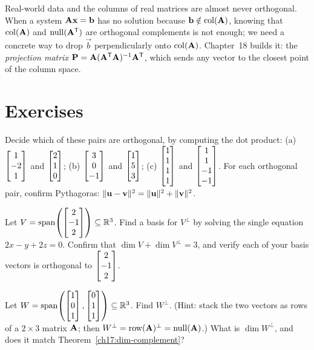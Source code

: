 \begin{connectionbox}
Real-world data and the columns of real matrices are almost never orthogonal. When a system
$\mathbf{A}\mathbf{x}=\mathbf{b}$ has no solution because $\mathbf{b} \notin \operatorname{col}(\mathbf{A})$, knowing that
$\operatorname{col}(\mathbf{A})$ and $\operatorname{null}(\mathbf{A}^{\mathsf{T}})$ are orthogonal complements is not enough; we need a
concrete way to drop $\vec{b}$ perpendicularly onto $\operatorname{col}(\mathbf{A})$. Chapter~18 builds it: the
\emph{projection matrix} $\mathbf{P} = \mathbf{A}(\mathbf{A}^{\mathsf{T}}\mathbf{A})^{-1}\mathbf{A}^{\mathsf{T}}$, which sends any vector
to the closest point of the column space.
\end{connectionbox}

\section{Exercises}

\begin{exercise}\label{ch17:ex-basic-dot}
Decide which of these pairs are orthogonal, by computing the dot product:
(a) $\begin{bmatrix}1\\-2\\1\end{bmatrix}$ and $\begin{bmatrix}2\\1\\0\end{bmatrix}$;\quad
(b) $\begin{bmatrix}3\\0\\-1\end{bmatrix}$ and $\begin{bmatrix}1\\5\\3\end{bmatrix}$;\quad
(c) $\begin{bmatrix}1\\1\\1\\1\end{bmatrix}$ and $\begin{bmatrix}1\\1\\-1\\-1\end{bmatrix}$.
For each orthogonal pair, confirm Pythagoras: $\lVert\mathbf{u}-\mathbf{v}\rVert^2=\lVert\mathbf{u}\rVert^2+\lVert\mathbf{v}\rVert^2$.
\end{exercise}

\begin{exercise}\label{ch17:ex-complement-line}
Let $V=\operatorname{span}\!\left(\begin{bmatrix}2\\-1\\2\end{bmatrix}\right)\subseteq\mathbb{R}^3$. Find a basis for $V^\perp$ by solving the
single equation $2x-y+2z=0$. Confirm that $\dim V+\dim V^\perp=3$, and verify each of your basis
vectors is orthogonal to $\begin{bmatrix}2\\-1\\2\end{bmatrix}$.
\end{exercise}

\begin{exercise}\label{ch17:ex-complement-plane}
Let $W=\operatorname{span}\!\left(\begin{bmatrix}1\\0\\1\end{bmatrix},\begin{bmatrix}0\\1\\1\end{bmatrix}\right)\subseteq\mathbb{R}^3$. Find $W^\perp$.
(Hint: stack the two vectors as rows of a $2\times3$ matrix $\mathbf{A}$; then
$W^\perp=\operatorname{row}(\mathbf{A})^\perp=\operatorname{null}(\mathbf{A})$.) What is $\dim W^\perp$, and does it match
Theorem~\ref{ch17:dim-complement}?
\end{exercise}

